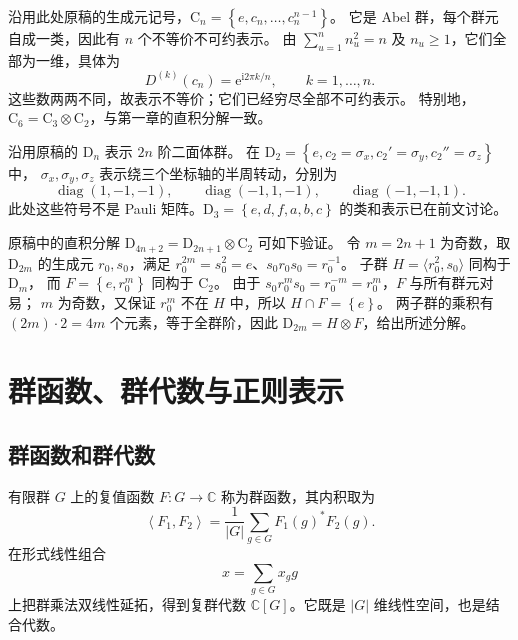 \begin{example}[循环群]
沿用此处原稿的生成元记号，$\mathrm{C}_n=\left\{e,c_n,\ldots,c_n^{n-1}\right\}$。
它是 Abel 群，每个群元自成一类，因此有 $n$ 个不等价不可约表示。
由 $\sum_{u=1}^{n}n_u^2=n$ 及 $n_u\geq1$，它们全部为一维，具体为
\begin{equation}
D^{\left(k\right)}\left(c_n\right)=\mathrm{e}^{\mathrm{i}2\pi k/n},\qquad k=1,\ldots,n.
\end{equation}
这些数两两不同，故表示不等价；它们已经穷尽全部不可约表示。
特别地，$\mathrm{C}_6=\mathrm{C}_3\otimes\mathrm{C}_2$，与第一章的直积分解一致。
\end{example}

\begin{example}[二面体群]
沿用原稿的 $\mathrm{D}_n$ 表示 $2n$ 阶二面体群。
在 $\mathrm{D}_2=\left\{e,c_2=\sigma_x,c_2'=\sigma_y,c_2''=\sigma_z\right\}$ 中，
$\sigma_x,\sigma_y,\sigma_z$ 表示绕三个坐标轴的半周转动，分别为
\begin{equation}
\operatorname{diag}\left(1,-1,-1\right),\qquad\operatorname{diag}\left(-1,1,-1\right),\qquad\operatorname{diag}\left(-1,-1,1\right).
\end{equation}
此处这些符号不是 Pauli 矩阵。$\mathrm{D}_3=\left\{e,d,f,a,b,c\right\}$ 的类和表示已在前文讨论。

原稿中的直积分解 $\mathrm{D}_{4n+2}=\mathrm{D}_{2n+1}\otimes\mathrm{C}_2$ 可如下验证。
令 $m=2n+1$ 为奇数，取 $\mathrm{D}_{2m}$ 的生成元 $r_0,s_0$，满足
$r_0^{2m}=s_0^2=e$、$s_0r_0s_0=r_0^{-1}$。
子群 $H=\langle r_0^2,s_0\rangle$ 同构于 $\mathrm{D}_m$，
而 $F=\left\{e,r_0^m\right\}$ 同构于 $\mathrm{C}_2$。
由于 $s_0r_0^ms_0=r_0^{-m}=r_0^m$，$F$ 与所有群元对易；
$m$ 为奇数，又保证 $r_0^m$ 不在 $H$ 中，所以 $H\cap F=\left\{e\right\}$。
两子群的乘积有 $\left(2m\right)\cdot2=4m$ 个元素，等于全群阶，因此
$\mathrm{D}_{2m}=H\otimes F$，给出所述分解。
\end{example}

\section{群函数、群代数与正则表示}
\subsection{群函数和群代数}
有限群 $G$ 上的复值函数 $F:G\to\mathbb{C}$ 称为群函数，其内积取为
\begin{equation}
\left\langle F_1,F_2\right\rangle=\frac{1}{\left|G\right|}\sum_{g\in G}F_1\left(g\right)^*F_2\left(g\right).
\end{equation}
在形式线性组合
\begin{equation}
x=\sum_{g\in G}x_g g
\end{equation}
上把群乘法双线性延拓，得到复群代数 $\mathbb{C}\left[G\right]$。它既是 $\left|G\right|$ 维线性空间，也是结合代数。


